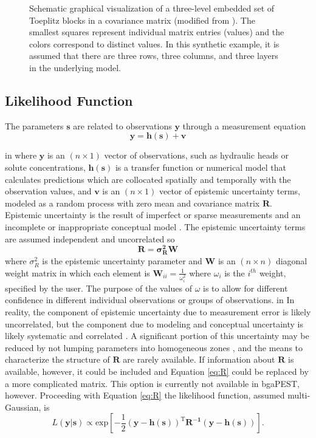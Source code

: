 \documentclass[11pt,oneside,onecolumn]{usgsreport}
\begin{document}
\begin{appendix}
\begin{figure}[!t]
\caption{\label{fig:toep}Schematic graphical visualization of a three-level
embedded set of Toeplitz blocks in a covariance matrix (modified from
\citet{MarcoDiss}). The smallest squares represent individual matrix
entries (values) and the colors correspond to distinct values. In
this synthetic example, it is assumed that there are three rows, three
columns, and three layers in the underlying model.}
\end{figure}



\subsection{Likelihood Function}

The parameters $\mathbf{s}$ are related to observations $\mathbf{y}$
through a measurement equation
\[
\mathbf{y=h(s)+v}
\]

 in
where $\mathbf{y}$ is an $(n\times1)$ vector of observations, such
as hydraulic heads or solute concentrations, $\mathbf{h(s)}$ is a
transfer function or numerical model that calculates predictions which
are collocated spatially and temporally with the observation values,
and $\mathbf{v}$ is an $(n\times1)$ vector of epistemic uncertainty
terms, modeled as a random process with zero mean and covariance matrix
$\mathbf{R.}$ Epistemic uncertainty is the result of imperfect or
sparse measurements and an incomplete or inappropriate conceptual
model \citep[p. 4]{Rubin2003}. The epistemic uncertainty terms are
assumed independent and uncorrelated so
\begin{equation}
\mathbf{R=\sigma_{R}^{2}W}\label{eq:R}
\end{equation}
 where $\sigma_{R}^{2}$ is the epistemic uncertainty parameter and
\textbf{$\mathbf{W}$} is an $(n\times n)$ diagonal weight matrix
in which each element is $\mathbf{W}_{ii}=\frac{1}{\omega_{i}^{2}}$
where $\omega_{i}$ is the $i^{th}$ weight, specified by the user.
The purpose of the values of $\omega$ is to allow for different confidence
in different individual observations or groups of observations.
 in
In reality, the component of epistemic uncertainty due to measurement
error is likely uncorrelated, but the component due to modeling and
conceptual uncertainty is likely systematic and correlated \citep{GaganisSmith2001}.
A significant portion of this uncertainty may be reduced by not lumping
parameters into homogeneous zones \citep{GallagherDoherty2007}, and
the means to characterize the structure of $\mathbf{R}$ are rarely
available. If information about $\mathbf{R}$ is available, however,
it could be included and Equation \ref{eq:R} could be replaced by
a more complicated matrix. This option is currently not available
in bgaPEST, however. Proceeding with Equation \ref{eq:R} the likelihood
function, assumed multi-Gaussian, is
\begin{equation}
L(\mathbf{y|s})\propto\mathrm{exp\left[-\frac{1}{2}\left(\mathbf{y-h}(\mathbf{s})\right)^{T}\mathbf{R^{-1}\left(\mathbf{y-h}(\mathbf{s})\right)}\right].}\label{eq:likelihood}
\end{equation}



\end{appendix}
\end{document}
